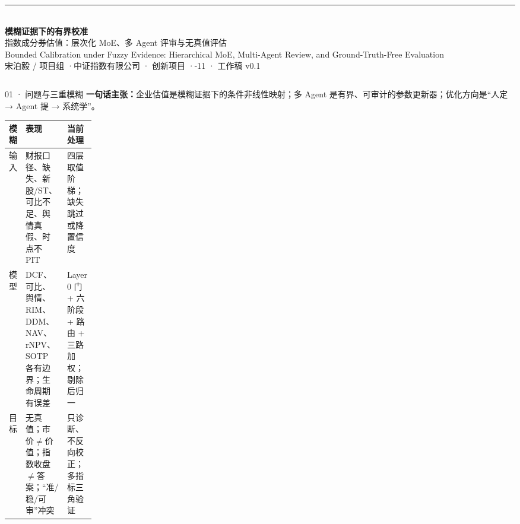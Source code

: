 \documentclass[final]{beamer}
\newcommand{\kw}[1]{\textcolor{csred}{\textbf{#1}}}
\begin{document}
\begin{frame}[t]

\begin{center}
{\color{csred}\rule{\linewidth}{2.4mm}}\\[7mm]
{\fontsize{74}{82}\selectfont\bfseries 模糊证据下的有界校准}\\[5mm]
{\fontsize{35}{43}\selectfont 指数成分券估值：层次化 MoE、多 Agent 评审与无真值评估}\\[4mm]
{\fontsize{20}{26}\selectfont\color{dim}Bounded Calibration under Fuzzy Evidence: Hierarchical MoE, Multi-Agent Review, and Ground-Truth-Free Evaluation}\\[7mm]
{\fontsize{25}{31}\selectfont 宋泊毅 / 项目组 \quad·\quad 中证指数有限公司 · 创新项目 \quad·-11 · 工作稿 v0.1}
\end{center}

\vspace{3mm}

\begin{columns}[t,onlytextwidth]

\begin{column}{0.315\textwidth}

\begin{block}{01 ·  问题与三重模糊}
{\bfseries 一句话主张：}企业估值是模糊证据下的条件非线性映射；多 Agent 是有界、可审计的参数更新器；优化方向是“人定 → Agent 提 → 系统学”。

\vspace{2mm}
{\fontsize{22}{28}\selectfont
\begin{tabularx}{\linewidth}{@{}>{\raggedright\arraybackslash}p{0.17\linewidth}YY@{}}
\toprule
\kw{模糊} & \kw{表现} & \kw{当前处理} \\
\midrule
输入 & 财报口径、缺失、新股/ST、可比不足、舆情真假、时点不 PIT & 四层取值阶梯；缺失跳过或降置信度 \\
模型 & DCF、可比、舆情、RIM、DDM、NAV、rNPV、SOTP 各有边界；生命周期有误差 & Layer 0 门 + 六阶段 + 路由 + 三路加权；剔除后归一 \\
目标 & 无真值；市价$\neq$价值；指数收盘$\neq$答案；“准/稳/可审”冲突 & 只诊断、不反向校正；多指标三角验证 \\
\bottomrule
\end{tabularx}}


\end{block}
\end{column}
\end{columns}
\end{frame}
\end{document}
